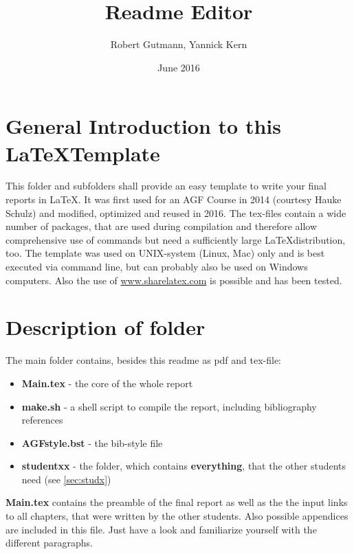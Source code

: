 \documentclass[12pt,a4paper,notitlepage]{scrreprt}
\title{Readme Editor}
\author{Robert Gutmann, Yannick Kern}
\date{June 2016}
\begin{document}
\setcounter{tocdepth}{2}


\maketitle


\section{General Introduction to this \LaTeX Template}

This folder and subfolders shall provide an easy template to write your final reports in \LaTeX. It was first used for an AGF Course in 2014 (courtesy Hauke Schulz) and modified, optimized and reused in 2016. The tex-files contain a wide number of packages, that are used during compilation and therefore allow comprehensive use of commands but need a sufficiently large \LaTeX distribution, too. The template was used on UNIX-system (Linux, Mac) only and is best executed via command line, but can probably also be used on Windows computers. Also the use of \url{www.sharelatex.com} is possible and has been tested.


\section{Description of folder}
\label{sec:desciption}
The main folder contains, besides this readme as pdf and tex-file:

\begin{itemize}
	\item \textbf{Main.tex} - the core of the whole report
	\item \textbf{make.sh} - a shell script to compile the report, including bibliography references
	\item \textbf{AGFstyle.bst} - the bib-style file
	\item \textbf{studentxx} - the folder, which contains \textbf{everything}, that the other students need (see \autoref{sec:studx})
\end{itemize}

\textbf{Main.tex} contains the preamble of the final report as well as the the input links to all chapters, that were written by the other students. Also possible appendices are included in this file. Just have a look and familiarize yourself with the different paragraphs.\\
\end{document}
